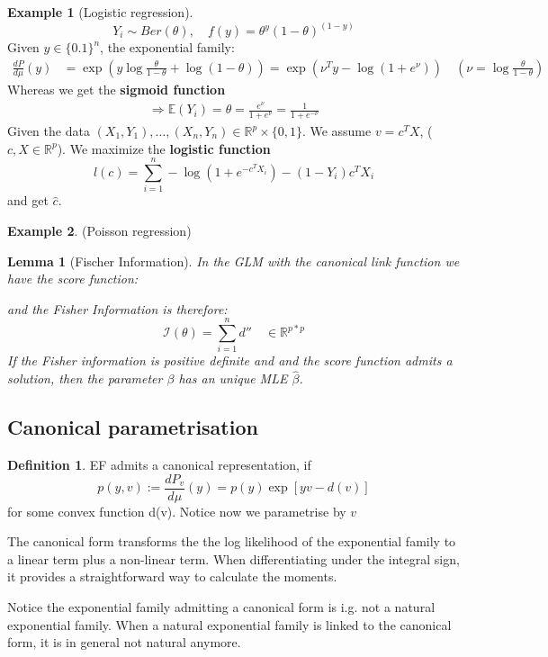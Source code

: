 \documentclass[a4paper,12pt, oneside, fleqn]{book}
\newtheorem{lemma}[theorem]{Lemma}
\theoremstyle{definition}
\newtheorem{definition}{Definition}[section]
\newtheorem*{example}{Example}
\theoremstyle{remark}
\begin{document}
\begin{example}[Logistic regression]
\begin{equation*}
	Y_i \sim Ber(\theta), \quad f(y) = \theta^y(1-\theta)^{(1-y)}
\end{equation*}
Given $ y \in \{0. 1\}^n$, the exponential family:
\begin{align*}
	\frac{dP}{d\mu}(y) &= \exp\left( y \log \frac{\theta}{1 - \theta} + \log (1 - \theta)\right) = \exp( \nu^T y - \log (1 + e^\nu))
	\quad (\nu = \log \frac{\theta}{1-\theta})
\end{align*}
Whereas we get the \textbf{sigmoid function}
\begin{align*}
	 \Rightarrow \mathbb{E}(Y_i) = \theta = \frac{e^\nu}{1 + e^\nu} = \frac{1}{1 + e^{-\nu}}
\end{align*} 
Given the data $(X_1, Y_1), \dots, (X_n, Y_n) \in \mathbb{R}^p \times \{0, 1\}$. We assume $v = c^T X$, ($c, X \in \mathbb{R}^p$). We maximize the \textbf{logistic function}
\begin{equation*}
	l(c) = \sum_{i= 1}^n -\log (1+ e^{-c^TX_i}) - (1- Y_i) c^TX_i
\end{equation*}
and get $\hat{c}$.
\end{example}


\begin{example}(Poisson regression)
\end{example}

\begin{lemma}[Fischer Information]
In the GLM with the canonical link function we have the score function:

and the Fisher Information is therefore:
\begin{equation}
    \mathcal{I}(\theta) =  \sum_{i = 1}^n d'' \quad \in \mathbb{R}^{p* p}
\end{equation}
If the Fisher information is positive definite and and the score function admits a solution, then the parameter $\beta$ has an unique MLE $\hat{\beta}$.
\end{lemma}

\subsection{Canonical parametrisation}
\begin{definition}
	EF admits a canonical representation, if
	\begin{equation} \label{DF:EFc}
		p(y, v) := \frac{dP_v}{d\mu}(y) = p(y)\exp [yv - d(v)]
	\end{equation}
	for some convex function d(v). Notice now we parametrise by $v$
\end{definition}
The canonical form transforms the the log likelihood of the exponential family to a linear term plus a non-linear term. When differentiating under the integral sign, it provides a straightforward way to calculate the moments.\par 
Notice the exponential family admitting a canonical form is i.g. not a natural exponential family. When a natural exponential family is linked to the canonical form, it is in general not natural anymore.
\end{document}
